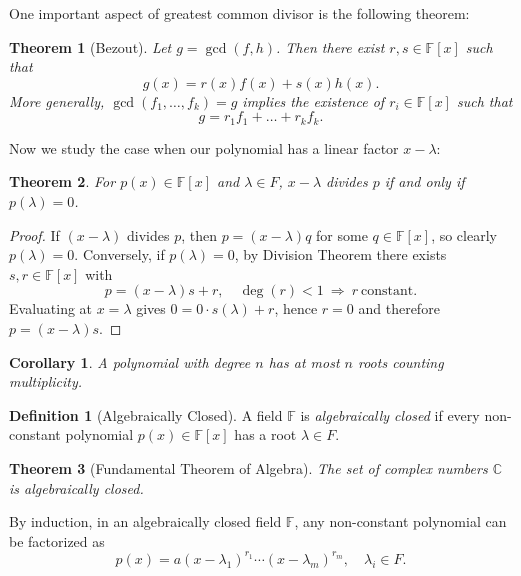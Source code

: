 \documentclass[11pt,openany]{book}
\theoremstyle{plain}
\newtheorem{theorem}{Theorem}[chapter]
\newtheorem{corollary}[corollary]{Corollary}
\theoremstyle{definition}
\newtheorem{definition}[definition]{Definition}
\theoremstyle{remark}
\begin{document}
One important aspect of greatest common divisor is the following theorem:
\begin{theorem} [Bezout] \label{thm:bezout}
Let $g = \gcd(f,h)$. Then there exist $r,s \in \mathbb{F}[x]$ such that
\[
    g(x) = r(x)f(x) + s(x)h(x).
\]
More generally, $\gcd(f_1, \dots, f_k) = g$ implies the existence of $r_i \in \mathbb{F}[x]$ such that
\[
    g = r_1 f_1 + \dots + r_k f_k.
\]
\end{theorem}

Now we study the case when our polynomial has a linear factor $x - \lambda$:
\begin{theorem}  
For $p(x) \in \mathbb{F}[x]$ and $\lambda \in F$, $x - \lambda$ divides $p$ if and only if $p(\lambda) = 0$.
\end{theorem}
\begin{proof}  
If $(x - \lambda)$ divides $p$, then $p = (x - \lambda)q$ for some $q \in \mathbb{F}[x]$, so clearly $p(\lambda) = 0$.  
Conversely, if $p(\lambda) = 0$, by Division Theorem there exists $s,r \in \mathbb{F}[x]$ with
\[
    p = (x - \lambda)s + r, \quad \deg(r) < 1 \ \Rightarrow\ r \ \text{constant}.
\]
Evaluating at $x=\lambda$ gives $0 = 0 \cdot s(\lambda) + r$, hence $r=0$ and therefore $p = (x - \lambda)s$.
\end{proof}

\begin{corollary}  
A polynomial with degree $n$ has at most $n$ roots counting multiplicity.
\end{corollary}

\begin{definition} [Algebraically Closed] 
A field $\mathbb{F}$ is \textit{algebraically closed} if every non-constant polynomial $p(x) \in \mathbb{F}[x]$ has a root $\lambda \in F$.
\end{definition}

\begin{theorem} [Fundamental Theorem of Algebra]  
The set of complex numbers $\mathbb{C}$ is algebraically closed.
\end{theorem}

By induction, in an algebraically closed field $\mathbb{F}$, any non-constant polynomial can be factorized as
\[
    p(x) = a(x - \lambda_1)^{r_1} \cdots (x - \lambda_m)^{r_m}, \quad \lambda_i \in F.
\]





\end{document}
